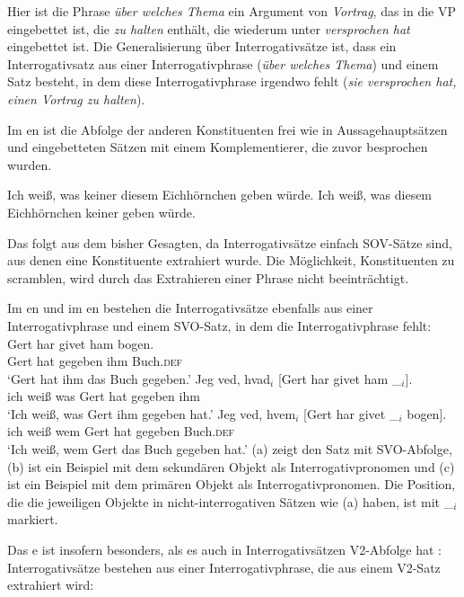 \noindent
Hier ist die Phrase \emph{über welches Thema} ein Argument von \emph{Vortrag},
das in die VP eingebettet ist, die \emph{zu halten} enthält, die wiederum unter
\emph{versprochen hat} eingebettet ist. Die Generalisierung über Interrogativsätze ist, dass ein
Interrogativsatz aus einer Interrogativphrase (\emph{über welches Thema}) und einem Satz besteht,
in dem diese Interrogativphrase irgendwo fehlt (\emph{sie versprochen
  hat, einen Vortrag zu halten}).

Im en ist die Abfolge der anderen Konstituenten frei wie in Aussagehauptsätzen und eingebetteten
Sätzen mit einem Komplementierer, die zuvor besprochen wurden.

\eal
\ex Ich weiß, was keiner diesem Eichhörnchen geben würde. \german
\ex Ich weiß, was diesem Eichhörnchen keiner geben würde.
\zl

\noindent
Das folgt aus dem bisher Gesagten, da Interrogativsätze einfach SOV-Sätze sind, aus denen eine
Konstituente extrahiert wurde. Die Möglichkeit, Konstituenten zu scramblen, wird durch das Extrahieren einer Phrase nicht beeinträchtigt.


Im en und im en bestehen die Interrogativsätze ebenfalls aus einer Interrogativphrase und einem SVO-Satz,
in dem die Interrogativphrase fehlt:
\eal
\ex
\gll Gert har givet ham bogen.\\
     Gert hat gegeben ihm Buch.\textsc{def}\\
\glt `Gert hat ihm das Buch gegeben.'
\ex
\gll Jeg ved, hvad$_i$ [Gert har givet ham \_$_i$].\\
     ich weiß was \spacebr{}Gert hat gegeben ihm\\
\glt `Ich weiß, was Gert ihm gegeben hat.'
\ex
\gll Jeg ved, hvem$_i$ [Gert har givet \_$_i$   bogen].\\
     ich weiß wem \spacebr{}Gert hat gegeben {} Buch.\textsc{def}\\
\glt `Ich weiß, wem Gert das Buch gegeben hat.'
\zl
{}
(a) zeigt den Satz mit SVO-Abfolge, (b) ist ein Beispiel mit dem sekundären Objekt als
Interrogativpronomen und (c) ist ein Beispiel mit dem primären Objekt als
Interrogativpronomen. Die Position, die die jeweiligen Objekte in nicht-interrogativen Sätzen wie (a)
haben, ist mit \_$_i$ markiert.

Das e ist insofern besonders, als es auch in Interrogativsätzen V2-Abfolge hat \citep[Abschnitte~4.1, 4.2]{Diesing90a}: Interrogativsätze
bestehen aus einer Interrogativphrase, die aus einem V2-Satz extrahiert wird:

